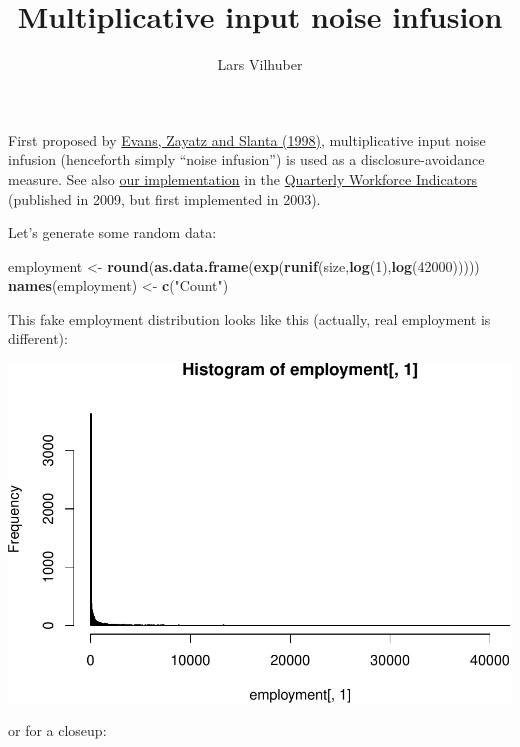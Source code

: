 \documentclass[]{article}
\title{Multiplicative input noise infusion}
\author{Lars Vilhuber}
\date{}
\newenvironment{Shaded}{\begin{snugshade}}{\end{snugshade}}
\newcommand{\KeywordTok}[1]{\textcolor[rgb]{0.13,0.29,0.53}{\textbf{{#1}}}}
\newcommand{\DecValTok}[1]{\textcolor[rgb]{0.00,0.00,0.81}{{#1}}}
\newcommand{\StringTok}[1]{\textcolor[rgb]{0.31,0.60,0.02}{{#1}}}
\newcommand{\NormalTok}[1]{{#1}}
\begin{document}
\maketitle

First proposed by
\href{http://www.jos.nu/Articles/abstract.asp?article=144537}{Evans,
Zayatz and Slanta (1998)}, multiplicative input noise infusion
(henceforth simply ``noise infusion'') is used as a disclosure-avoidance
measure. See also
\href{https://ideas.repec.org/h/nbr/nberch/0485.html}{our
implementation} in the \href{http://lehd.ces.census.gov/data}{Quarterly
Workforce Indicators} (published in 2009, but first implemented in
2003).

Let's generate some random data:

\begin{Shaded}
\begin{Highlighting}[]
\NormalTok{employment <-}\StringTok{ }\KeywordTok{round}\NormalTok{(}\KeywordTok{as.data.frame}\NormalTok{(}\KeywordTok{exp}\NormalTok{(}\KeywordTok{runif}\NormalTok{(size,}\KeywordTok{log}\NormalTok{(}\DecValTok{1}\NormalTok{),}\KeywordTok{log}\NormalTok{(}\DecValTok{42000}\NormalTok{)))))}
\KeywordTok{names}\NormalTok{(employment) <-}\StringTok{ }\KeywordTok{c}\NormalTok{(}\StringTok{"Count"}\NormalTok{)}
\end{Highlighting}
\end{Shaded}

This fake employment distribution looks like this (actually, real
employment is different):

\includegraphics{rampdist_files/figure-latex/unnamed-chunk-3-1.pdf}

or for a closeup:
\end{document}
